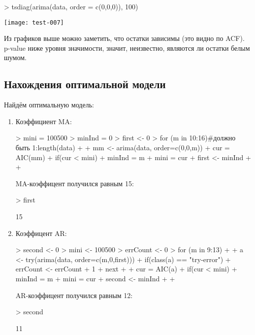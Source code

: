 \documentclass[a4paper]{extarticle}
\begin{document}
\begin{Schunk}
\begin{Sinput}
> tsdiag(arima(data, order = c(0,0,0)), 100)
\end{Sinput}
\end{Schunk}
\texttt{[image: test-007]}

Из графиков выше можно заметить, что остатки зависимы (это видно по ACF). p-value ниже уровня значимости, значит, неизвестно, являются ли остатки белым шумом.

\subsection{Нахождения оптимальной модели}

Найдём оптимальную модель:

\begin{enumerate}
\item Коэффициент MA:
\begin{Schunk}
\begin{Sinput}
> mini = 100500
> minInd = 0
> first <- 0
> for (m in 10:16)#должно быть 1:length(data)
+ {
+      mm <- arima(data, order=c(0,0,m))
+      cur = AIC(mm)
+      if(cur < mini){
+        minInd = m
+        mini = cur
+        first <- minInd
+      }
+ }
\end{Sinput}
\end{Schunk}

MA-коэффицент получился равным 15:
\begin{Schunk}
\begin{Sinput}
> first
\end{Sinput}
\begin{Soutput}
[1] 15
\end{Soutput}
\end{Schunk}
\item Коэффицент AR:
\begin{Schunk}
\begin{Sinput}
> second <- 0
> mini <- 100500
> errCount <- 0
> for (m in 9:13)
+ {
+   a <- try(arima(data, order=c(m,0,first)))
+   if(class(a) == "try-error"){ 
+     errCount <- errCount + 1
+     next
+   }
+   cur = AIC(a)
+   if(cur < mini){
+     minInd = m
+     mini = cur
+     second <- minInd
+   }
+ }
\end{Sinput}
\end{Schunk}
AR-коэффицент получился равным 12:
\begin{Schunk}
\begin{Sinput}
> second
\end{Sinput}
\begin{Soutput}
[1] 11
\end{Soutput}
\end{Schunk}


\end{enumerate}
\end{document}
